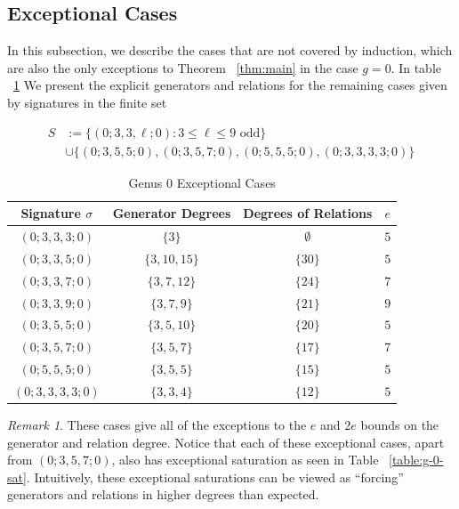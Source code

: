 \documentclass{amsart}
\theoremstyle{plain}
\theoremstyle{definition}
\theoremstyle{remark}
\newtheorem{rem}[thm]{Remark}
\numberwithin{equation}{section}
\newcommand\ssec{\subsection}
\begin{document}
\ssec{Exceptional Cases}
\label{ssec:g-0-exceptional}
In this subsection, we describe the cases that are not covered by induction, which are also the only exceptions to Theorem ~\ref{thm:main} in the case $g = 0$.
In table ~\ref{table:g-0-exceptional} We present the explicit generators and relations for the remaining
cases given by signatures in the finite set

\begin{align*}
	S &:= \{(0; 3, 3, \ell; 0) : 3 \leq \ell \leq 9 \text{ odd}\} \\
		&\cup \{(0; 3, 5, 5; 0) ,(0; 3, 5, 7; 0), (0; 5, 5, 5; 0), (0; 3, 3, 3, 3; 0)\}
\end{align*}


\begin{table}
\begin{tabular}
	{| c || c | c | c |}
	\hline
	Signature $\sigma$ & Generator Degrees & Degrees of Relations & $e$ \\
	\hline
	\hline

	$(0; 3, 3, 3; 0)$ & $\{3\}$ & $\emptyset$ & $5$ \\	\hline

	$(0; 3, 3, 5; 0)$ & $\{3, 10, 15\}$ & $\{30\}$ & $5$ \\	\hline
	
	$(0; 3, 3, 7; 0)$ & $\{3, 7, 12\}$ & $\{24\}$ & $7$ \\	\hline
	
	$(0; 3, 3, 9; 0)$ & $\{3, 7, 9\}$ & $\{21\}$ & $9$ \\	\hline
	
	$(0; 3, 5, 5; 0)$ & $\{3, 5, 10\}$ & $\{20\}$ & $5$ \\	\hline
	
	$(0; 3, 5, 7; 0)$ & $\{3, 5, 7\}$ & $\{17\}$ & $7$ \\	\hline
	
	$(0; 5, 5, 5; 0)$ & $\{3, 5, 5\}$ & $\{15\}$ & $5$ \\	\hline
	
	$(0; 3, 3, 3, 3; 0)$ & $\{3, 3, 4\}$ & $\{12\}$ & $5$ \\	\hline
\end{tabular}

\caption{Genus 0 Exceptional Cases}
\label{table:g-0-exceptional}
\end{table}

\begin{rem}
These cases give all of the exceptions to the $e$ and $2e$ bounds
on the generator and relation degree. Notice that each of these
exceptional cases, apart from $(0; 3, 5, 7; 0)$, also has
exceptional saturation as seen in Table ~\ref{table:g-0-sat}.
Intuitively, these exceptional saturations can be viewed as
``forcing'' generators and relations in higher degrees than expected.
\end{rem}
\end{document}
